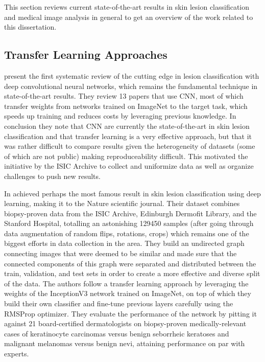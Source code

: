 This section reviews current state-of-the-art results in skin lesion classification and medical image analysis in general to get an overview of the work related to this dissertation.

\subsection{Transfer Learning Approaches}

\citeauthor{Brinker2018} \cite{Brinker2018} present the first systematic review of the cutting edge in lesion classification with deep convolutional neural networks, which remains the fundamental technique in state-of-the-art results. They review 13 papers that use \ac{CNN}, most of which transfer weights from networks trained on ImageNet to the target task, which speeds up training and reduces costs by leveraging previous knowledge. In conclusion they note that \ac{CNN} are currently the state-of-the-art in skin lesion classification and that transfer learning is a very effective approach, but that it was rather difficult to compare results given the heterogeneity of datasets (some of which are not public) making reproduceability difficult. This motivated the initiative by the \ac{ISIC} Archive to collect and uniformize data as well as organize challenges to push new results.

In \citeyear{nature2017} \citeauthor{nature2017} \cite{nature2017} achieved perhaps the most famous result in skin lesion classification using deep learning, making it to the Nature scientific journal. Their dataset combines biopsy-proven data from the \ac{ISIC} Archive, Edinburgh Dermofit Library, and the Stanford Hospital, totalling an astonishing 129450 samples (after going through data augmentation of random flips, rotations, crops) which remains one of the biggest efforts in data collection in the area. They build an undirected graph connecting images that were deemed to be similar and made sure that the connected components of this graph were separated and distributed between the train, validation, and test sets in order to create a more effective and diverse split of the data. The authors follow a transfer learning approach by leveraging the weights of the InceptionV3 network trained on ImageNet, on top of which they build their own classifier and fine-tune previous layers carefully using the RMSProp optimizer. They evaluate the performance of the network by pitting it against 21 board-certified dermatologists on biopsy-proven medically-relevant cases of keratinocyte carcinomas versus benign seborrheic keratoses and malignant melanomas versus benign nevi, attaining performance on par with experts.

